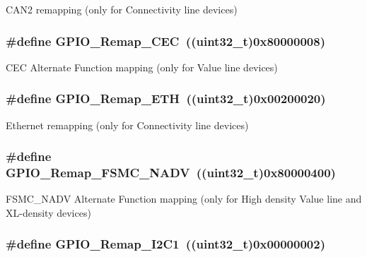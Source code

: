 \label{group__GPIO__Remap__define_ga14c09a5050063b703fa07181afc56ee6}
CAN2 remapping (only for Connectivity line devices) \hypertarget{group__GPIO__Remap__define_gac5961690908d4a0737e82b5a7d271b9b}{
\subsubsection[{GPIO\_\-Remap\_\-CEC}]{\setlength{\rightskip}{0pt plus 5cm}\#define GPIO\_\-Remap\_\-CEC~((uint32\_\-t)0x80000008)}}
\label{group__GPIO__Remap__define_gac5961690908d4a0737e82b5a7d271b9b}
CEC Alternate Function mapping (only for Value line devices) \hypertarget{group__GPIO__Remap__define_gaf578688bb4d1a17fb3a103946e7c2eb7}{
\subsubsection[{GPIO\_\-Remap\_\-ETH}]{\setlength{\rightskip}{0pt plus 5cm}\#define GPIO\_\-Remap\_\-ETH~((uint32\_\-t)0x00200020)}}
\label{group__GPIO__Remap__define_gaf578688bb4d1a17fb3a103946e7c2eb7}
Ethernet remapping (only for Connectivity line devices) \hypertarget{group__GPIO__Remap__define_ga97088efda8b8a057f4ba58de8f51625f}{
\subsubsection[{GPIO\_\-Remap\_\-FSMC\_\-NADV}]{\setlength{\rightskip}{0pt plus 5cm}\#define GPIO\_\-Remap\_\-FSMC\_\-NADV~((uint32\_\-t)0x80000400)}}
\label{group__GPIO__Remap__define_ga97088efda8b8a057f4ba58de8f51625f}
FSMC\_\-NADV Alternate Function mapping (only for High density Value line and XL-\/density devices) \hypertarget{group__GPIO__Remap__define_ga6cf601e6db62cb2e9dbbccb276401b18}{
\subsubsection[{GPIO\_\-Remap\_\-I2C1}]{\setlength{\rightskip}{0pt plus 5cm}\#define GPIO\_\-Remap\_\-I2C1~((uint32\_\-t)0x00000002)}}

